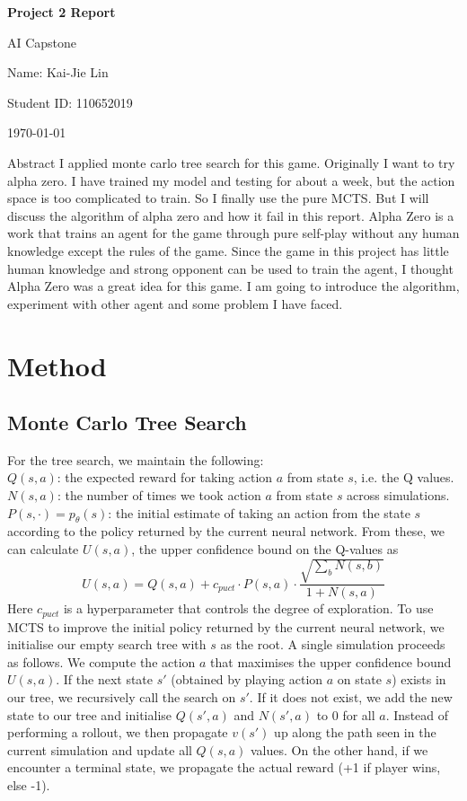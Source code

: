\documentclass{article} %
\newcommand{\question}[2][]{\begin{flushleft}\textbf{Question #1}: \textit{#2}\end{flushleft}}
\newcommand{\maketitletwo}[2][]{\begin{center}
        \Large{\textbf{Project 2 Report}
        
            AI Capstone} %
        \vspace{5pt}
        
        \normalsize{
            Name: Kai-Jie Lin 
            
            Student ID: 110652019
            
            \today}
        \vspace{15pt}
        \end{center}}
\begin{document}
    \maketitletwo[5]  %

    \section{Abstract}
    I applied monte carlo tree search for this game. Originally I want to try alpha zero. I have trained my model and testing for about a week, but the action space is too complicated to train.
    So I finally use the pure MCTS. But I will discuss the algorithm of alpha zero and how it fail in this report. 
    Alpha Zero is a work that trains an agent for the game through pure self-play without any human knowledge except the rules of the game.
    Since the game in this project has little human knowledge and strong opponent can be used to train the agent, I thought Alpha Zero was a great idea for this game.
    I am going to introduce the algorithm, experiment with other agent and some problem I have faced.
    \section{Method}
    \subsection{Monte Carlo Tree Search}
    For the tree search, we maintain the following: \\
    $Q(s, a)$: the expected reward for taking action $a$ from state $s$, i.e. the Q values. \\
    $N(s, a)$: the number of times we took action $a$ from state $s$ across simulations. \\
    $P(s, \cdot) = p_\theta(s)$: the initial estimate of taking an action from the state $s$ according to the policy returned by the current neural network.
    From these, we can calculate $U(s,a)$, the upper confidence bound on the Q-values as
    $$
    U(s,a) = Q(s,a)+c_{puct} \cdot P(s,a) \cdot \frac{\sqrt{\sum_b N(s, b)}}{1 + N(s, a)}
    $$
    Here $c_{puct}$ is a hyperparameter that controls the degree of exploration. To use MCTS to improve the initial policy returned by the current neural network, 
    we initialise our empty search tree with $s$ as the root. A single simulation proceeds as follows. We compute the action $a$ that maximises the upper confidence bound 
    $U(s,a)$. If the next state $s'$ (obtained by playing action $a$ on state $s$) exists in our tree, we recursively call the search on $s'$. If it does not exist, 
    we add the new state to our tree and initialise $Q(s', a)$ and $N(s',a)$ to 0 for all $a$. Instead of performing a rollout, we then propagate $v(s')$ up along the 
    path seen in the current simulation and update all $Q(s,a)$ values. On the other hand, if we encounter a terminal state, we propagate the actual reward (+1 if player wins, else -1).
\end{document}
